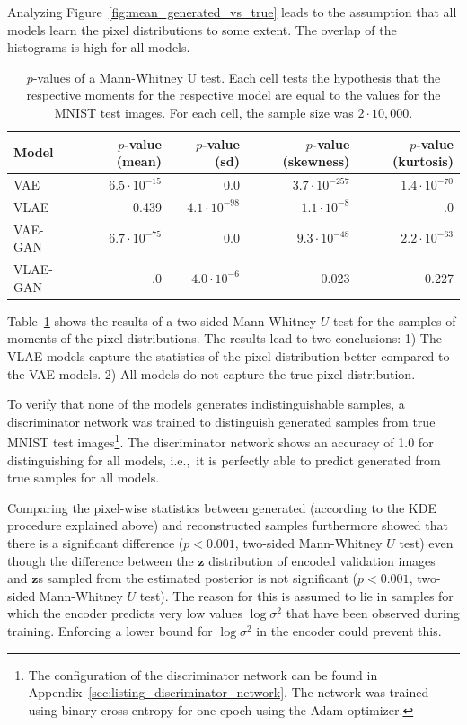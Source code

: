 Analyzing Figure~\ref{fig:mean_generated_vs_true} leads to the assumption that all models learn the pixel distributions to some extent.
The overlap of the histograms is high for all models.
\begin{table}
    \begin{tabular}{lrrrr}
        \toprule
        Model              & $p$-value (mean)    & $p$-value (sd)      & $p$-value (skewness) & $p$-value (kurtosis) \\
        \midrule
        \ac{VAE}           & $6.5\cdot 10^{-15}$ & 0.0                 & $3.7\cdot 10^{-257}$ & $1.4\cdot 10^{-70}$  \\
        \ac{VLAE}          & 0.439               & $4.1\cdot 10^{-98}$ & $1.1\cdot 10^{-8}$   & .0                   \\
        \ac{VAE}-\ac{GAN}  & $6.7\cdot 10^{-75}$ & 0.0                 & $9.3\cdot 10^{-48}$  & $2.2\cdot 10^{-63}$  \\
        \ac{VLAE}-\ac{GAN} & .0                  & $4.0\cdot 10^{-6}$  & 0.023                & 0.227                \\
        \bottomrule
    \end{tabular}
    \caption{$p$-values of a Mann-Whitney U test. Each cell tests the hypothesis that the respective moments for the respective model are equal to the values for the \textsc{MNIST} test images. For each cell, the sample size was $2\cdot 10,000$.}
    \label{tab:vae-vlae-mnist}
\end{table}
Table~\ref{tab:vae-vlae-mnist} shows the results of a two-sided Mann-Whitney $U$ test for the samples of moments of the pixel distributions.
The results lead to two conclusions: 1) The \ac{VLAE}-models capture the statistics of the pixel distribution better compared to the \ac{VAE}-models.
2) All models do not capture the true pixel distribution.

To verify that none of the models generates indistinguishable samples, a discriminator network was trained to distinguish generated samples from true \textsc{MNIST} test images\footnote{The configuration of the discriminator network can be found in Appendix~\ref{sec:listing_discriminator_network}. The network was trained using binary cross entropy for one epoch using the Adam optimizer.}.
The discriminator network shows an accuracy of 1.0 for distinguishing for all models, i.e.,~it is perfectly able to predict generated from true samples for all models.

Comparing the pixel-wise statistics between generated (according to the \ac{KDE} procedure explained above) and reconstructed samples furthermore showed that there is a significant difference ($p < 0.001$, two-sided Mann-Whitney $U$ test) even though the difference between the $\bm{z}$ distribution of encoded validation images and $\bm{z}$s sampled from the estimated posterior is not significant ($p < 0.001$, two-sided Mann-Whitney $U$ test).
The reason for this is assumed to lie in samples for which the encoder predicts very low values $\log \sigma^2$ that have been observed during training.
Enforcing a lower bound for $\log \sigma^2$ in the encoder could prevent this.

